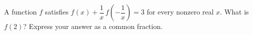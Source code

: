 A function $f$ satisfies $f(x)+\dfrac1x\,f\left(-\dfrac1x\right)=3$ for every nonzero real $x$. What is $f(2)$? Express your answer as a common fraction.
